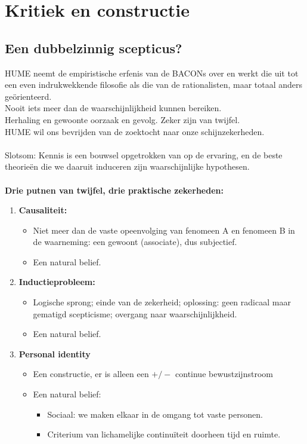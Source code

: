 \documentclass[11pt,a4paper]{article}
\begin{document}
\section{Kritiek en constructie}
\subsection{Een dubbelzinnig scepticus?}
HUME neemt de empiristische erfenis van de BACONs over en werkt die uit tot een even indrukwekkende filosofie als die van de rationalisten, maar totaal anders ge\"orienteerd.
\\
Nooit iets meer dan de waarschijnlijkheid kunnen bereiken.
\\
Herhaling en gewoonte  oorzaak en gevolg. Zeker zijn van twijfel. 
\\
HUME wil ons bevrijden van de zoektocht naar onze schijnzekerheden.
\\
\\
Slotsom: Kennis is een bouwsel opgetrokken van op de ervaring, en de beste theorieën die we daaruit induceren zijn waarschijnlijke hypothesen. 
\\
\\
\textbf{Drie putnen van twijfel, drie praktische zekerheden:}

\begin{enumerate}
\item \textbf{Causaliteit:} 
\begin{itemize}
\item Niet meer dan de vaste opeenvolging van fenomeen A en fenomeen B in de waarneming: een gewoont (associate), dus subjectief.
\item Een natural belief.
\end{itemize}

\item \textbf{Inductieprobleem:}
\begin{itemize}
\item Logische sprong; einde van de zekerheid; oplossing: geen radicaal maar gematigd scepticisme; overgang naar waarschijnlijkheid.
\item Een natural belief.
\end{itemize}

\item \textbf{Personal identity}
\begin{itemize}
\item Een constructie, er is alleen een $+/-$ continue bewustzijnstroom
\item Een natural belief: \begin{itemize}
\item Sociaal: we maken elkaar in de omgang tot vaste personen.
\item Criterium van lichamelijke continu\"iteit doorheen tijd en ruimte.
\end{itemize}
\end{itemize}
\end{enumerate}
\end{document}

